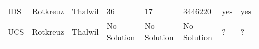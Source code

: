 \documentclass[11pt]{article}
\begin{document}
\begin{longtable}[]{@{}llllllll@{}}
\begin{minipage}[t]{0.11\columnwidth}\raggedright
IDS\strut
\end{minipage} & \begin{minipage}[t]{0.11\columnwidth}\raggedright
Rotkreuz\strut
\end{minipage} & \begin{minipage}[t]{0.09\columnwidth}\raggedright
Thalwil\strut
\end{minipage} & \begin{minipage}[t]{0.09\columnwidth}\raggedright
36\strut
\end{minipage} & \begin{minipage}[t]{0.09\columnwidth}\raggedright
17\strut
\end{minipage} & \begin{minipage}[t]{0.09\columnwidth}\raggedright
3446220\strut
\end{minipage} & \begin{minipage}[t]{0.09\columnwidth}\raggedright
yes\strut
\end{minipage} & \begin{minipage}[t]{0.09\columnwidth}\raggedright
yes\strut
\end{minipage}\tabularnewline
\begin{minipage}[t]{0.11\columnwidth}\raggedright
UCS\strut
\end{minipage} & \begin{minipage}[t]{0.11\columnwidth}\raggedright
Rotkreuz\strut
\end{minipage} & \begin{minipage}[t]{0.09\columnwidth}\raggedright
Thalwil\strut
\end{minipage} & \begin{minipage}[t]{0.09\columnwidth}\raggedright
No Solution\strut
\end{minipage} & \begin{minipage}[t]{0.09\columnwidth}\raggedright
No Solution\strut
\end{minipage} & \begin{minipage}[t]{0.09\columnwidth}\raggedright
No Solution\strut
\end{minipage} & \begin{minipage}[t]{0.09\columnwidth}\raggedright
?\strut
\end{minipage} & \begin{minipage}[t]{0.09\columnwidth}\raggedright
?\strut
\end{minipage}\tabularnewline
\bottomrule
\end{longtable}
\end{document}
